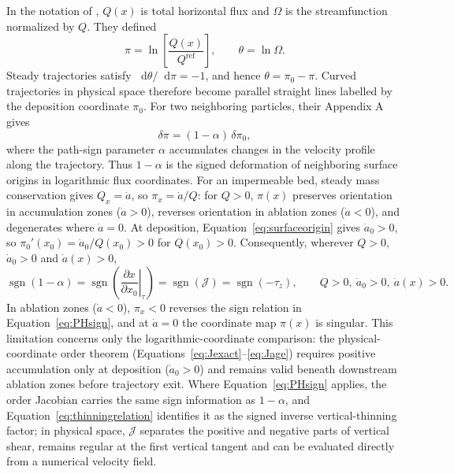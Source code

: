 \documentclass[review]{igs}
\begin{document}
In the notation of \citet{ParreninHindmarsh2007}, \(Q(x)\) is total horizontal flux and \(\Omega\) is the streamfunction normalized by \(Q\). They defined
\begin{equation}
\pi=\ln\!\left[\frac{Q(x)}{Q^{\mathrm{ref}}}\right],
\qquad
\theta=\ln\Omega.
\end{equation}
Steady trajectories satisfy \(\mathop{}\!\mathrm{d}\theta/\mathop{}\!\mathrm{d}\pi=-1\), and hence \(\theta=\pi_0-\pi\). Curved trajectories in physical space therefore become parallel straight lines labelled by the deposition coordinate \(\pi_0\). For two neighboring particles, their Appendix A gives
\begin{equation}
\delta\pi=(1-\alpha)\,\delta\pi_0,
\end{equation}
where the path-sign parameter \(\alpha\) accumulates changes in the velocity profile along the trajectory. Thus \(1-\alpha\) is the signed deformation of neighboring surface origins in logarithmic flux coordinates. For an impermeable bed, steady mass conservation gives \(Q_x=\dot a\), so \(\pi_x=\dot a/Q\): for \(Q>0\), \(\pi(x)\) preserves orientation in accumulation zones (\(\dot a>0\)), reverses orientation in ablation zones (\(\dot a<0\)), and degenerates where \(\dot a=0\). At deposition, Equation~\ref{eq:surfaceorigin} gives \(\dot a_0>0\), so \(\pi_0'(x_0)=\dot a_0/Q(x_0)>0\) for \(Q(x_0)>0\). Consequently, wherever \(Q>0\), \(\dot a_0>0\) and \(\dot a(x)>0\),
\begin{equation}
\operatorname{sgn}(1-\alpha)
=\operatorname{sgn}\!\left(
\left.\frac{\partial x}{\partial x_0}\right|_{\tau}
\right)
=\operatorname{sgn}(\mathcal{J})
=\operatorname{sgn}(-\tau_z),
\qquad Q>0,\ \dot a_0>0,\ \dot a(x)>0.
\label{eq:PHsign}
\end{equation}
In ablation zones (\(\dot a<0\)), \(\pi_x<0\) reverses the sign relation in Equation~\ref{eq:PHsign}, and at \(\dot a=0\) the coordinate map \(\pi(x)\) is singular. This limitation concerns only the logarithmic-coordinate comparison: the physical-coordinate order theorem (Equations~\ref{eq:Jexact}--\ref{eq:Jage}) requires positive accumulation only at deposition (\(\dot a_0>0\)) and remains valid beneath downstream ablation zones before trajectory exit. Where Equation~\ref{eq:PHsign} applies, the order Jacobian carries the same sign information as \(1-\alpha\), and Equation~\ref{eq:thinningrelation} identifies it as the signed inverse vertical-thinning factor; in physical space, \(\mathcal{J}\) separates the positive and negative parts of vertical shear, remains regular at the first vertical tangent and can be evaluated directly from a numerical velocity field.
\end{document}
